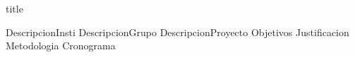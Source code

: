 \documentclass{article}
\begin{document}
{title}

\frontmatter

\tableofcontents





\mainmatter




{DescripcionInsti}
{DescripcionGrupo}
{DescripcionProyecto}
{Objetivos}
{Justificacion}
{Metodologia}
{Cronograma}


\newpage

\nocite{gomez2010introduccion}







\end{document}
